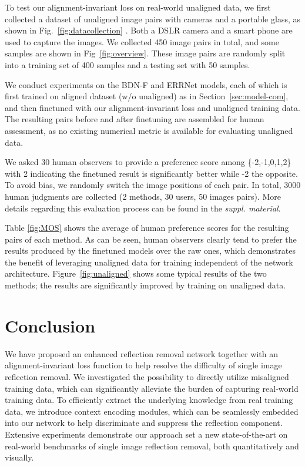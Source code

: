 \documentclass[10pt,twocolumn,letterpaper]{article}
\begin{document}
To test our alignment-invariant loss on real-world unaligned
data, we first collected a dataset of unaligned image pairs with cameras and a portable glass, as shown in Fig.~\ref{fig:datacollection} . Both a DSLR camera and a smart phone are used to capture the images. We collected 450 image pairs in total, and some samples are shown in Fig~\ref{fig:overview}. These image pairs are randomly split into a training set of 400 samples and a testing set with 50 samples.

We conduct experiments on the BDN-F and ERRNet models, each of which is first trained on aligned dataset (w/o unaligned) as in Section~\ref{sec:model-com}, and then finetuned with our alignment-invariant loss and unaligned training data. The resulting pairs before and after finetuning are assembled for human assessment, as no existing numerical metric is available for evaluating unaligned data.

We asked 30 human observers to provide a preference score among \{-2,-1,0,1,2\} with 2 indicating the finetuned result is significantly better while -2 the opposite. To avoid bias, we randomly switch the image positions of each pair. In total, $3000$ human judgments are collected (2 methods, 30 users, 50 images pairs). More details regarding this evaluation process can be found in the \emph{suppl. material}.

Table \ref{fig:MOS} shows the average of human preference scores for the  resulting pairs of each method. As can be seen, human observers clearly tend to prefer the results produced by the finetuned models over the raw ones, which demonstrates the benefit of leveraging unaligned data for training independent of the network architecture.
Figure~\ref{fig:unaligned} shows some typical results of the two methods; the results are significantly improved by training on unaligned data.

\section{Conclusion}
We have proposed an enhanced reflection removal network together with an alignment-invariant loss function to help resolve the difficulty of single image reflection removal. We investigated the possibility to directly utilize misaligned training data, which can significantly alleviate the burden of capturing real-world training data. To efficiently extract the underlying knowledge from real training data, we introduce context encoding modules, which can be seamlessly embedded into our network to help discriminate and suppress the reflection component. Extensive experiments demonstrate our approach set a new state-of-the-art on real-world benchmarks of single image reflection removal, both quantitatively and visually. 
\end{document}
